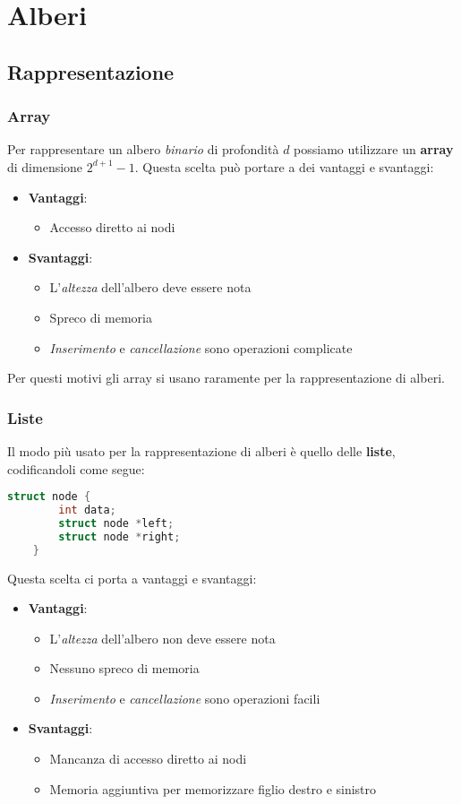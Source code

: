 \newpage
\section{Alberi}
\subsection{Rappresentazione}
\subsubsection{Array}
Per rappresentare un albero \emph{binario} di profondità $d$ possiamo utilizzare un \textbf{array} di dimensione $2^{d+1}-1$. Questa scelta può portare a dei vantaggi e svantaggi:
\begin{itemize}
	\item \textbf{Vantaggi}:
	\begin{itemize}
		\item Accesso diretto ai nodi
	\end{itemize}
	\item \textbf{Svantaggi}:
	\begin{itemize}
		\item L'\emph{altezza} dell'albero deve essere nota
		\item Spreco di memoria
		\item \emph{Inserimento} e \emph{cancellazione} sono operazioni complicate
	\end{itemize}
\end{itemize}
Per questi motivi gli array si usano raramente per la rappresentazione di alberi.
\subsubsection{Liste}
Il modo più usato per la rappresentazione di alberi è quello delle \textbf{liste}, codificandoli come segue:
\begin{lstlisting}[language=C, caption=Alberi con liste, mathescape=true]
	struct node {
		int data;
		struct node *left;
		struct node *right;
	}
\end{lstlisting}
Questa scelta ci porta a vantaggi e svantaggi:
\begin{itemize}
	\item \textbf{Vantaggi}:
	\begin{itemize}
		\item L'\emph{altezza} dell'albero non deve essere nota
		\item Nessuno spreco di memoria
		\item \emph{Inserimento} e \emph{cancellazione} sono operazioni facili
	\end{itemize}
	\item \textbf{Svantaggi}:
	\begin{itemize}
		\item Mancanza di accesso diretto ai nodi
		\item Memoria aggiuntiva per memorizzare figlio destro e sinistro
	\end{itemize}
\end{itemize}

